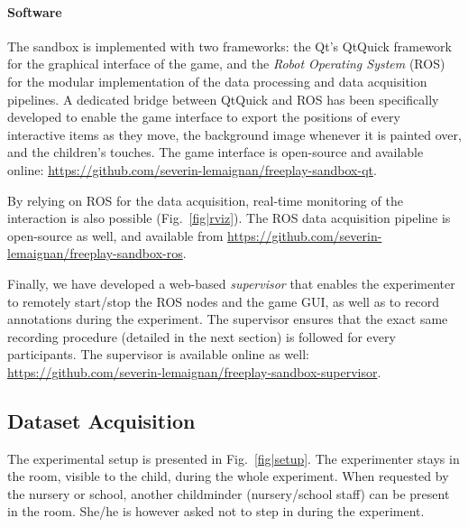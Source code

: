 \documentclass{article}
\begin{document}
\paragraph{Software}
The sandbox is implemented with two frameworks: the Qt's QtQuick framework
for the graphical interface of the game, and the \emph{Robot Operating System}
(ROS) for the modular implementation of the data processing and data acquisition
pipelines. A dedicated bridge between QtQuick and ROS has been specifically
developed to enable the game interface to export the positions of every
interactive items as they move, the background image whenever it is painted over,
and the children's touches. The game interface is open-source and available online:
\url{https://github.com/severin-lemaignan/freeplay-sandbox-qt}.

By relying on ROS for the data acquisition, real-time monitoring of the
interaction is also possible (Fig.~\ref{fig|rviz}).
The ROS data acquisition pipeline is open-source as well, and available from
\url{https://github.com/severin-lemaignan/freeplay-sandbox-ros}.

Finally, we have developed a web-based \emph{supervisor} that enables the
experimenter to remotely start/stop the ROS nodes and the game GUI, as well as to
record annotations during the experiment. The supervisor ensures that the exact
same recording procedure (detailed in the next section) is followed for every
participants. The supervisor is available online as well:
\url{https://github.com/severin-lemaignan/freeplay-sandbox-supervisor}.

\subsection{Dataset Acquisition}

The experimental setup is presented in Fig.~\ref{fig|setup}.  The experimenter
stays in the room, visible to the child, during the whole experiment. When
requested by the nursery or school, another childminder (nursery/school staff)
can be present in the room. She/he is however asked not to step in during the
experiment.
\end{document}
